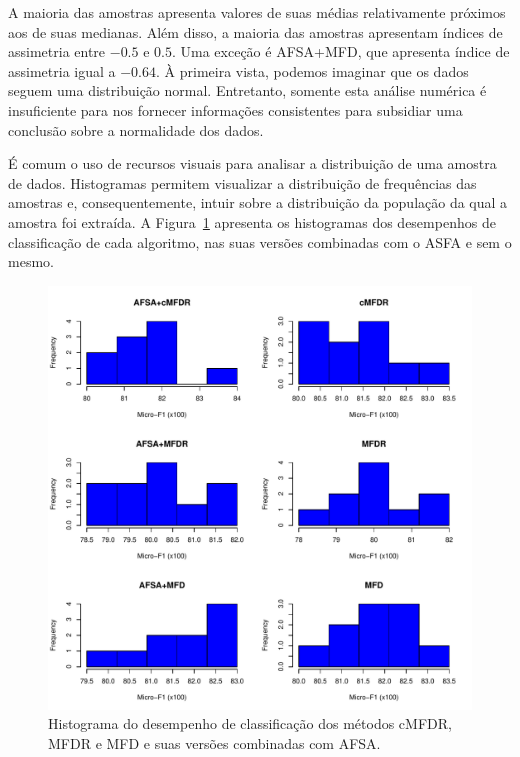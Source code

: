 \documentclass[conference]{IEEEtran}
\begin{document}
A maioria das amostras apresenta valores de suas médias relativamente próximos aos de suas medianas. Além disso, a maioria das amostras apresentam índices de assimetria entre $-0.5$ e $0.5$. Uma exceção é AFSA+MFD, que apresenta índice de assimetria igual a $-0.64$.
À primeira vista, podemos imaginar que os dados seguem uma distribuição normal. 
Entretanto, somente esta análise numérica é insuficiente para nos fornecer informações consistentes para subsidiar uma conclusão sobre a normalidade dos dados.


É comum o uso de recursos visuais para analisar a distribuição de uma amostra de dados. Histogramas permitem visualizar a distribuição de frequências das amostras e, consequentemente, intuir sobre a distribuição da população da qual a amostra foi extraída.
A Figura~\ref{fig:hist} apresenta os histogramas dos desempenhos de classificação de cada algoritmo, nas suas versões combinadas com o ASFA e sem o mesmo.

\begin{figure}[h!]
	\centering
	\includegraphics[width=\linewidth]{img/bluehistograms.pdf}
	\caption{Histograma do desempenho de classificação dos métodos cMFDR, MFDR e MFD e suas versões combinadas com AFSA.}
	\label{fig:hist}
\end{figure}
\end{document}
